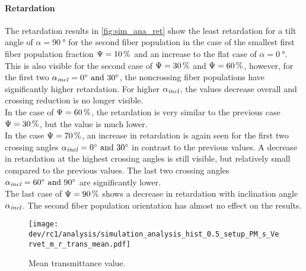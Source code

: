 \paragraph{Retardation}
The retardation results in \cref{fig:sim_ana_ret} show the least retardation for a tilt angle of $\alpha=\SI{90}{\degree}$ for the second fiber population in the case of the smallest first fiber population fraction $\textnormal{$\Psi$}=\SI{10}{\percent}$ and an increase to the flat case of $\alpha=\SI{0}{\degree}$.
\\
% 
This is also visible for the second case of $\textnormal{$\Psi$}=\SI{30}{\percent}$ and $\textnormal{$\Psi$}=\SI{60}{\percent}$, however, for the first two $\modelInc = \SIlist{0;30}{\degree}$, the noncrossing fiber populations have significantly higher retardation.
For higher $\textnormal{$\alpha_{\mathit{incl}}$}$, the values decrease overall and crossing reduction is no longer visible.
\\
% 
In the case of $\textnormal{$\Psi$}=\SI{60}{\percent}$, the retardation is very similar to the previous case $\textnormal{$\Psi$}=\SI{30}{\percent}$, but the value is much lower.
\\
% 
In the case $\textnormal{$\Psi$}=\SI{70}{\percent}$, an increase in retardation is again seen for the first two crossing angles $\modelInc=\SIlist{0;30}{\degree}$ in contrast to the previous values.
A decrease in retardation at the highest crossing angles is still visible, but relatively small compared to the previous values.
The last two crossing angles $\modelInc=\SIlist{60;90}{\degree}$ are significantly lower.
\\
%
The last case of $\textnormal{$\Psi$}=\SI{90}{\percent}$ shows a decrease in retardation with inclination angle $\textnormal{$\alpha_{\mathit{incl}}$}$.
The second fiber population orientation has almost no effect on the results.
% 
% 
% 
\begin{figure}[!p]
\centering
\texttt{[image: dev/rc1/analysis/simulation\_analysis\_hist\_0.5\_setup\_PM\_s\_Vervet\_m\_r\_trans\_mean.pdf]}
\caption[Simulation transmittance]{Mean transmittance value.}
\label{fig:sim_ana_trans}
\end{figure}
% 
